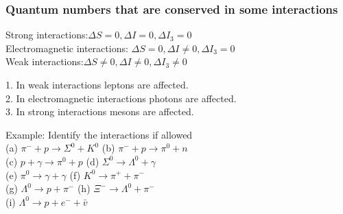 \subsubsection{Quantum numbers that are conserved in some interactions}
Strong interactions:\hspace{3cm}$\Delta S=0, \Delta I=0, \Delta I_3=0$\\
Electromagnetic interactions:\hspace{1.3cm} $\Delta S=0, \Delta I \neq 0, \Delta I_3=0$\\
Weak interactions:\hspace{3.1cm}$\Delta S \neq 0, \Delta I \neq 0, \Delta I_3 \neq 0$
\begin{note}
	1. In weak interactions leptons are affected.\\
	2. In electromagnetic interactions photons are affected.\\
	3. In strong interactions mesons are affected.\\
\end{note}
\begin{exercise}
	Example: Identify the interactions if allowed\\
	(a) $\pi^{-}+p \rightarrow \Sigma^0+K^0$\hspace{2cm}
	(b) $\pi^{-}+p \rightarrow \pi^0+n$\\
	(c) $p+\gamma \rightarrow \pi^0+p$\hspace{2.5cm}
	(d) $\Sigma^0 \rightarrow \Lambda^0+\gamma$\\
	(e) $\pi^0 \rightarrow \gamma+\gamma$\hspace{3.2cm}
	(f) $K^0 \rightarrow \pi^{+}+\pi^{-}$\\
	(g) $\Lambda^0 \rightarrow p+\pi^{-}$\hspace{2.8cm}
	(h) $\Xi^{-} \rightarrow \Lambda^0+\pi^{-}$\\
	(i) $\Lambda^0 \rightarrow p+e^{-}+\bar{v}$
\end{exercise}
